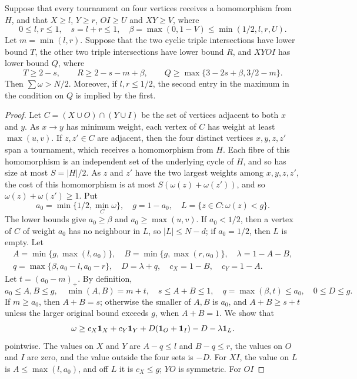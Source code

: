 \begin{lemma}
\label{root391:tournament-counts}\label{root406:small-count-part}
Suppose that every tournament on four vertices receives a homomorphism from $H$, and that
$X\ge l$, $Y\ge r$, $OI\ge U$ and $XY\ge V$, where
\[
 0\le l,r\le1,\quad s=l+r\le1,\quad
 \beta=\max(0,1-V)\le\min(1/2,l,r,U).
\]
Let $m=\min(l,r)$. Suppose that the two cyclic triple intersections have
lower bound $T$, the other two triple intersections have lower bound $R$, and $XYOI$ has lower bound $Q$, where
\[
 T\ge2-s,\qquad R\ge2-s-m+\beta,\qquad
 Q\ge\max\{3-2s+\beta,3/2-m\}.
\]
Then $\sum\omega>N/2$. Moreover, if $l,r\le1/2$, the second entry
in the maximum in the condition on $Q$ is implied by the first.
\end{lemma}
\begin{proof}
Let $C=(X\cup O)\cap(Y\cup I)$ be the set of vertices adjacent to both $x$ and $y$. As $x\to y$ has minimum weight, each vertex of $C$ has
weight at least $\max(u,v)$. If $z,z'\in C$ are adjacent, then the four distinct vertices
$x,y,z,z'$ span a tournament, which receives a homomorphism from $H$. Each fibre of
this homomorphism is an independent set of the underlying cycle of $H$, and so has size at most $S=|H|/2$. As $z$ and $z'$ have
the two largest weights among $x,y,z,z'$, the cost of this homomorphism is at most
$S(\omega(z)+\omega(z'))$, and so
$\omega(z)+\omega(z')\ge1$.
Put
\[
 a_0=\min\{1/2,\min_C\omega\},\quad g=1-a_0,
 \quad L=\{z\in C:\omega(z)<g\}.
\]
The lower bounds give $a_0\ge\beta$ and $a_0\ge\max(u,v)$. If $a_0<1/2$, then a vertex of $C$
of weight $a_0$ has no neighbour in $L$, so
$|L|\le N-d$; if $a_0=1/2$, then $L$ is empty. Let
\[
\begin{gathered}
 A=\min\{g,\max(l,a_0)\},\quad
 B=\min\{g,\max(r,a_0)\},\quad \lambda=1-A-B,\\
 q=\max\{\beta,a_0-l,a_0-r\},\quad D=\lambda+q,
 \quad c_X=1-B,\quad c_Y=1-A.
\end{gathered}
\]
Let $t=(a_0-m)_+$. By definition,
\[
 a_0\le A,B\le g,\quad \min(A,B)=m+t,\quad
 s\le A+B\le1,\quad q=\max(\beta,t)\le a_0,\quad 0\le D\le g.
\]
If $m\ge a_0$, then $A+B=s$; otherwise the smaller of $A,B$
is $a_0$, and $A+B\ge s+t$ unless the larger original bound exceeds
$g$, when $A+B=1$.
We show that
\[
 \omega\ge c_X\mathbf 1_X+c_Y\mathbf 1_Y+D(\mathbf 1_O+\mathbf 1_I)
 -D-\lambda\mathbf 1_L.
\]
pointwise.
The values on $X$ and $Y$ are $A-q\le l$ and $B-q\le r$,
the values on $O$ and $I$ are zero, and the value outside the four sets is $-D$.
For $XI$, the value on $L$ is $A\le\max(l,a_0)$, and
off $L$ it is $c_X\le g$; $YO$ is symmetric. For $OI$

\end{proof}
